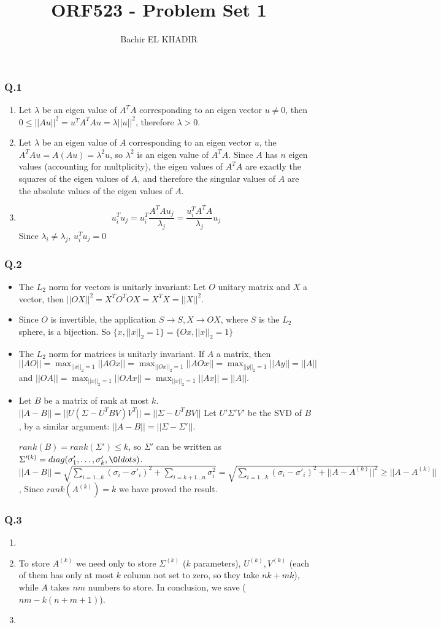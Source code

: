 \documentclass[12pt]{article}
\title{ORF523 - Problem Set 1}
\author{Bachir EL KHADIR }
\newcommand{\Q}[1]{\subsubsection*{Q.#1}}
\begin{document}
\maketitle
\Q{1}
\begin{enumerate}
\item Let $\lambda$ be an eigen value of $A^TA$ corresponding to an eigen vector $u \ne 0$, then $0 \le ||Au||^2 = u^TA^TAu = \lambda ||u||^2$, therefore $\lambda > 0$.
\item Let $\lambda$ be an eigen value of $A$ corresponding to an eigen vector $u$, the $A^TAu = A(Au) = \lambda^2 u$, so $\lambda^2$ is an eigen value of $A^TA$. Since $A$ has $n$ eigen values (accounting for multplicity), the eigen values of $A^TA$ are exactly the squares of the eigen values of $A$, and therefore the singular values of $A$ are the absolute values of the eigen values of $A$.

\item
  $$u_i^Tu_j = u_i^T\frac{A^TAu_j}{\lambda_j} = \frac{u_i^TA^TA}{\lambda_j}u_j$$
  Since $\lambda_i \ne \lambda_j$, $u_i^Tu_j = 0$

\end{enumerate}
\Q{2}
\begin{itemize}
\item The $L_2$ norm for vectors is unitarly invariant:
  Let $O$ unitary matrix and $X$ a vector, then $||OX||^2  = X^TO^TOX = X^TX = ||X||^2$.
\item Since $O$ is invertible, the application $S \rightarrow S, X \rightarrow OX$, where $S$ is the $L_2$ sphere, is a bijection. So   $\{ x, ||x||_2 = 1\} = \{ Ox, ||x||_2 = 1\}$
\item The $L_2$ norm for matrices is unitarly invariant.
  If $A$ a matrix, then $||AO|| = \max_{||x||_2 = 1} ||AOx|| = \max_{||Ox||_2 = 1} ||AOx|| = \max_{||y||_2 = 1} ||Ay|| = ||A||$ and
  $||OA|| = \max_{||x||_2 = 1} ||OAx|| = \max_{||x||_2 = 1} ||Ax|| = ||A||$.
\item
  Let $B$ be a matrix of rank at most $k$.
  $||A - B|| = ||U(\Sigma - U^TBV)V^T|| = ||\Sigma - U^TBV||$
  Let $U'\Sigma'V'$ be the SVD of $B$, by a similar argument: $||A - B|| = ||\Sigma - \Sigma'||$.
  
  $rank(B) = rank(\Sigma') \le k$, so $\Sigma'$ can be written as $\Sigma'^{(k)} = diag(\sigma_1', \ldots, \sigma'_k, \0 ldots )$.
  $||A - B|| = \sqrt{\sum_{i = 1 ... k} (\sigma_i - \sigma'_i)^2 + \sum_{i = k+1 \ldots n} \sigma_i^2}
  = \sqrt{\sum_{i = 1 ... k} (\sigma_i - \sigma'_i)^2 + ||A - A^{(k)}||^2} \ge ||A - A^{(k)}||$,
  Since $rank(A^{(k)}) = k$ we have proved the result.
\end{itemize}

\Q{3}
\begin{enumerate}
\item
\item To store $A^{(k)}$ we need only to store $\Sigma^{(k)}$ ($k$ parameters), $U^{(k)}, V^{(k)}$ (each of them has only at most $k$ column not set to zero, so they take $nk + mk$), while $A$ takes $nm$ numbers to store.
  In conclusion, we save ($nm - k(n+m+1)$).
\item 
\end{enumerate}
\end{document}
